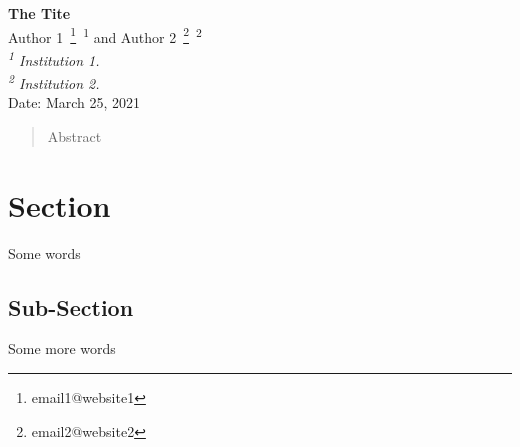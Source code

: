 



\begin{center}
{\bf The Tite} \bsk\\
    Author 1~\footnote{email1@website1}~\textsuperscript{1} 
    and Author 2~\footnote{email2@website2}~\textsuperscript{2}\\
{\em \textsuperscript{1} Institution 1.}\\
{\em \textsuperscript{2} Institution 2.}\\
Date: March 25, 2021
\end{center}

\begin{abstract}
Abstract
\end{abstract}

\section{Section}
\xb
{}
\xa

Some words

\subsection{Sub-Section}
\xb
{}
\xa

Some more words~\cite{AuthorYear}





